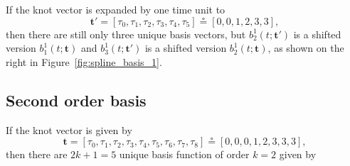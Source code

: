 \documentclass{article}
\newcommand{\defeq}{\circeq}
\begin{document}
If the knot vector is expanded by one time unit to
\[
\mathbf{t}' = [\tau_0, \tau_1, \tau_2, \tau_3, \tau_4, \tau_5] \defeq [0, 0, 1, 2, 3, 3],
\]
then there are still only three unique basis vectors, but 
$b_2^1(t; \mathbf{t}')$ is a shifted version $b_1^1(t; \mathbf{t})$ and $b_3^1(t; \mathbf{t}')$ is a shifted version $b_2^1(t; \mathbf{t})$, as shown on the right in Figure~\ref{fig:spline_basis_1}.

\clearpage


\subsection{Second order basis}

If the knot vector is given by
\[
\mathbf{t} = [\tau_0, \tau_1, \tau_2, \tau_3, \tau_4, \tau_5, \tau_6, \tau_7, \tau_8] \defeq [0, 0, 0, 1, 2, 3, 3, 3],
\]
then there are $2k+1=5$ unique basis function of order $k=2$ given by
\end{document}
